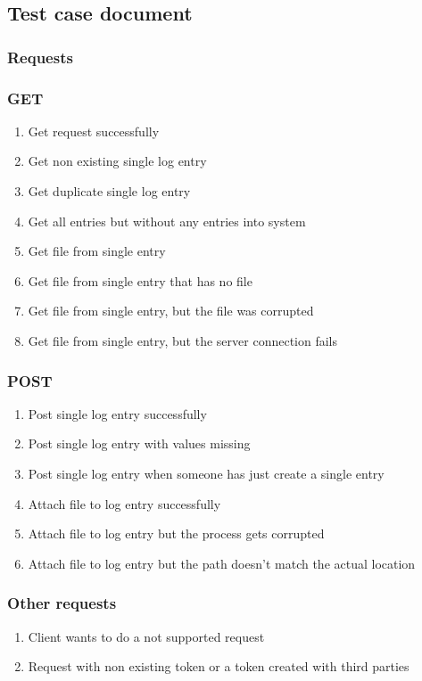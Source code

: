 \subsection{Test case document}
\subsubsection{Requests}

\subsubsection{GET}
\begin{enumerate}
\item Get request successfully
\item Get non existing single log entry
\item Get duplicate single log entry
\item Get all entries but without any entries into system
\item Get file from single entry
\item Get file from single entry that has no file
\item Get file from single entry, but the file was corrupted
\item Get file from single entry, but the server connection fails
\end{enumerate}

\subsubsection{POST}
\begin{enumerate}
\item Post single log entry successfully
\item Post single log entry with values missing
\item Post single log entry when someone has just create a single entry
\item Attach file to log entry successfully
\item Attach file to log entry but the process gets corrupted
\item Attach file to log entry but the path doesn't match the actual location
\end{enumerate}

\subsubsection{Other requests}
\begin{enumerate}
\item Client wants to do a not supported request
\item Request with non existing token or a token created with third parties

\end{enumerate}


